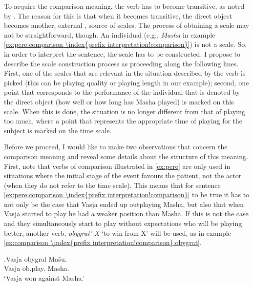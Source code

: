 To acquire the comparison  meaning, the verb has to become transitive, as noted by \citet{Shvedova:82}. The reason for this is that when it becomes transitive, the direct object becomes another, external , source of scales. The process of obtaining a scale may not be straightforward, though. An individual (e.g., \textit{Masha} in example \ref{ex:pere:comparison \index{prefix interpretation!comparison}}) is not a scale. So, in order to interpret the sentence, the scale has to be constructed. I propose to describe the scale construction process as proceeding along the following lines. First, one of the scales that are relevant in the situation described by the verb is picked (this can be playing quality or playing length in our example); second, one point that corresponds to the performance of the individual that is denoted by the direct object (how well or how long has Masha played) is marked on this scale. When this is done, the situation is no longer different from that of playing too much, where a point that represents the appropriate time of playing for the subject is marked on the time scale.

Before we proceed, I would like to make two observations that concern the comparison  meaning and reveal some details about the structure of this meaning. First, note that verbs of comparison  illustrated in \ref{ex:pere} are only used in situations where the initial stage of the event favours the patient, not the actor (when they do not refer to the time scale). This means that for sentence \ref{ex:pere:comparison \index{prefix interpretation!comparison}} to be true it has to not only be the case that Vasja ended up outplaying Masha, but also that when Vasja started to play he had a weaker position than Masha. If this is not the case and they simultaneously start to play without expectations who will be playing better, another verb, \textit{obygrat' X} `to win from X' will be used, as in example \ref{ex:comparison \index{prefix interpretation!comparison}:obygrat}. 

\exg.\label{ex:comparison \index{prefix interpretation!comparison}:obygrat}Vasja obygral Ma\v{s}u.\\
Vasja ob.play. Masha.\\
\trans `Vasja won against Masha.'

